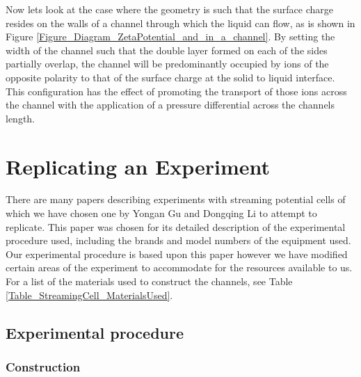 Now lets look at the case where the geometry is such that the surface charge
resides on the walls of a channel through which the liquid can flow, as is
shown in Figure \ref{Figure_Diagram_ZetaPotential_and_in_a_channel}.  By
setting the width of the channel such that the double layer formed on each of
the sides partially overlap, the channel will be predominantly occupied by ions
of the opposite polarity to that of the surface charge at the solid to liquid
interface. This configuration has the effect of promoting the transport of
those ions across the channel with the application of a pressure differential
across the channels length.




\section{Replicating an Experiment}

There are many papers describing experiments with streaming potential cells
\cite{Gu2000,Mala1997,Scales1992,VanderHeyden2006} of which we have chosen one
by Yongan Gu and Dongqing Li \cite{Gu2000} to attempt to replicate. This paper
was chosen for its detailed description of the experimental procedure used,
including the brands and model numbers of the equipment used. Our experimental
procedure is based upon this paper however we have modified certain areas of
the experiment to accommodate for the resources available to us. For a list of
the materials used to construct the channels, see Table
\ref{Table_StreamingCell_MaterialsUsed}.


\subsection{\label{sub:Experimental-Procedure}Experimental procedure}


\subsubsection*{Construction}

